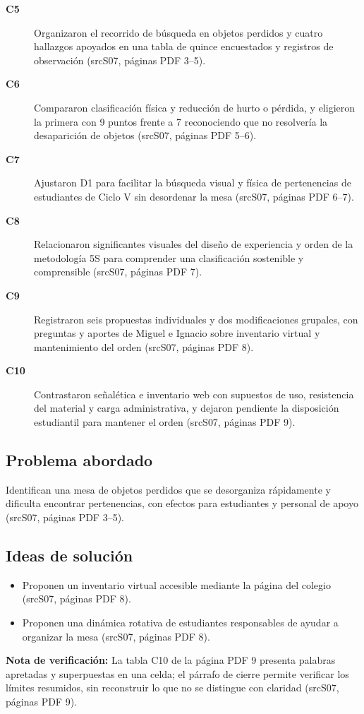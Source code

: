\documentclass[11pt,a4paper]{article}
\newcommand{\evid}[2]{(\csname src#1\endcsname, páginas PDF #2)}
\begin{document}
\begin{description}
\item[\textbf{C5}] Organizaron el recorrido de búsqueda en objetos perdidos y cuatro hallazgos apoyados en una tabla de quince encuestados y registros de observación \evid{S07}{3--5}.
\item[\textbf{C6}] Compararon clasificación física y reducción de hurto o pérdida, y eligieron la primera con 9 puntos frente a 7 reconociendo que no resolvería la desaparición de objetos \evid{S07}{5--6}.
\item[\textbf{C7}] Ajustaron D1 para facilitar la búsqueda visual y física de pertenencias de estudiantes de Ciclo V sin desordenar la mesa \evid{S07}{6--7}.
\item[\textbf{C8}] Relacionaron significantes visuales del diseño de experiencia y orden de la metodología 5S para comprender una clasificación sostenible y comprensible \evid{S07}{7}.
\item[\textbf{C9}] Registraron seis propuestas individuales y dos modificaciones grupales, con preguntas y aportes de Miguel e Ignacio sobre inventario virtual y mantenimiento del orden \evid{S07}{8}.
\item[\textbf{C10}] Contrastaron señalética e inventario web con supuestos de uso, resistencia del material y carga administrativa, y dejaron pendiente la disposición estudiantil para mantener el orden \evid{S07}{9}.
\end{description}
\subsection*{Problema abordado}
Identifican una mesa de objetos perdidos que se desorganiza rápidamente y dificulta encontrar pertenencias, con efectos para estudiantes y personal de apoyo \evid{S07}{3--5}.
\subsection*{Ideas de solución}
\begin{itemize}
\item Proponen un inventario virtual accesible mediante la página del colegio \evid{S07}{8}.
\item Proponen una dinámica rotativa de estudiantes responsables de ayudar a organizar la mesa \evid{S07}{8}.
\end{itemize}
{\small\textbf{Nota de verificación:} La tabla C10 de la página PDF 9 presenta palabras apretadas y superpuestas en una celda; el párrafo de cierre permite verificar los límites resumidos, sin reconstruir lo que no se distingue con claridad \evid{S07}{9}.}
\clearpage
\end{document}
